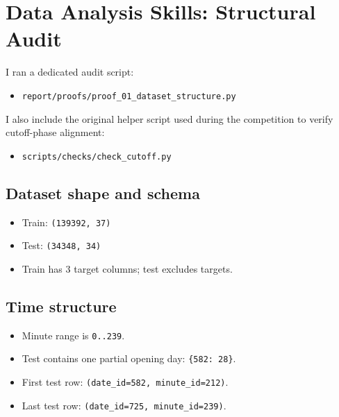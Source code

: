 \section{Data Analysis Skills: Structural Audit}

I ran a dedicated audit script:
\begin{itemize}[leftmargin=1.5em]
  \item \texttt{report/proofs/proof\_01\_dataset\_structure.py}
\end{itemize}
I also include the original helper script used during the competition to verify cutoff-phase alignment:
\begin{itemize}[leftmargin=1.5em]
  \item \texttt{scripts/checks/check\_cutoff.py}
\end{itemize}

\subsection{Dataset shape and schema}
\begin{itemize}[leftmargin=1.5em]
  \item Train: \texttt{(139392, 37)}
  \item Test: \texttt{(34348, 34)}
  \item Train has 3 target columns; test excludes targets.
\end{itemize}

\subsection{Time structure}
\begin{itemize}[leftmargin=1.5em]
  \item Minute range is \texttt{0..239}.
  \item Test contains one partial opening day: \texttt{\{582: 28\}}.
  \item First test row: \texttt{(date\_id=582, minute\_id=212)}.
  \item Last test row: \texttt{(date\_id=725, minute\_id=239)}.
\end{itemize}

